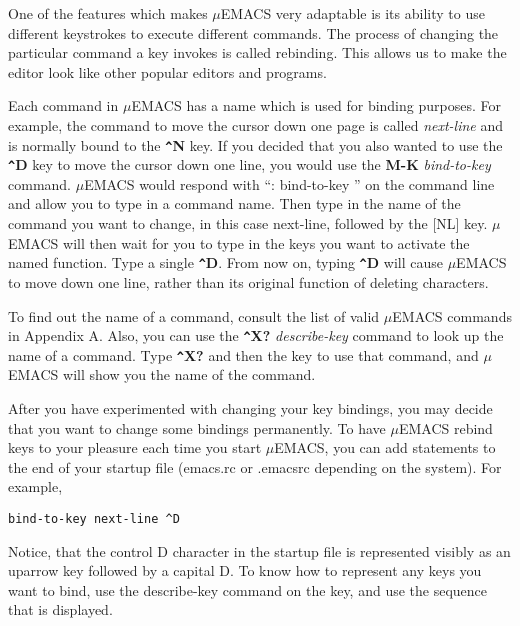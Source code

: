 One of the features which makes $\mu$EMACS very adaptable is its
ability to use different keystrokes to execute different commands. The
process of changing the particular command a key invokes is called
rebinding. This allows us to make the editor look like other popular
editors and programs.

Each command in $\mu$EMACS has a name which is used for binding
purposes. For example, the command to move the cursor down one page is
called {\it next-line} and is normally bound to the {\bf \verb+^+N}
key. If you decided that you also wanted to use the {\bf \verb+^+D} key
to move the cursor down one line, you would use the {\bf M-K} {\it
bind-to-key} command. $\mu$EMACS would respond with ``: bind-to-key ''
on the command line and allow you to type in a command name. Then type
in the name of the command you want to change, in this case next-line,
followed by the [NL] key. $\mu$EMACS will then wait for you to type in
the keys you want to activate the named function. Type a single {\bf
\verb+^+D}. From now on, typing {\bf \verb+^+D} will cause $\mu$EMACS
to move down one line, rather than its original function of deleting
characters.

To find out the name of a command, consult the list of valid $\mu$EMACS
commands in Appendix A. Also, you can use the {\bf \verb+^+X?} {\it
describe-key} command to look up the name of a command. Type {\bf
\verb+^+X?} and then the key to use that command, and $\mu$EMACS will
show you the name of the command.

After you have experimented with changing your key bindings, you may
decide that you want to change some bindings permanently. To have $\mu$EMACS
rebind keys to your pleasure each time you start $\mu$EMACS, you can add
statements to the end of your startup file (emacs.rc or .emacsrc
depending on the system). For example,

\begin{verbatim}
bind-to-key next-line ^D
\end{verbatim}

Notice, that the control D character in the startup file is represented
visibly as an uparrow key followed by a capital D. To know how to
represent any keys you want to bind, use the describe-key command on
the key, and use the sequence that is displayed.

